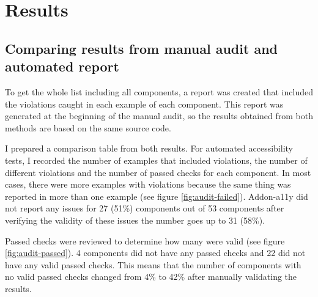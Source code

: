 \documentclass{master_thesis}
\begin{document}
\section{Results}


\subsection{Comparing results from manual audit and automated report}

To get the whole list including all components, a report was created that included the violations caught in each example of each component. This report was generated at the beginning of the manual audit, so the results obtained from both methods are based on the same source code.

I prepared a comparison table from both results. For automated accessibility tests, I recorded the number of examples that included violations, the number of different violations and the number of passed checks for each component. In most cases, there were more examples with violations because the same thing was reported in more than one example (see figure \ref{fig:audit-failed}). Addon-a11y did not report any issues for 27 (51\%) components out of 53 components after verifying the validity of these issues the number goes up to 31 (58\%).

Passed checks were reviewed to determine how many were valid (see figure \ref{fig:audit-passed}). 4 components did not have any passed checks and 22 did not have any valid passed checks. This means that the number of components with no valid passed checks changed from 4\%  to 42\% after manually validating the results.
\end{document}

